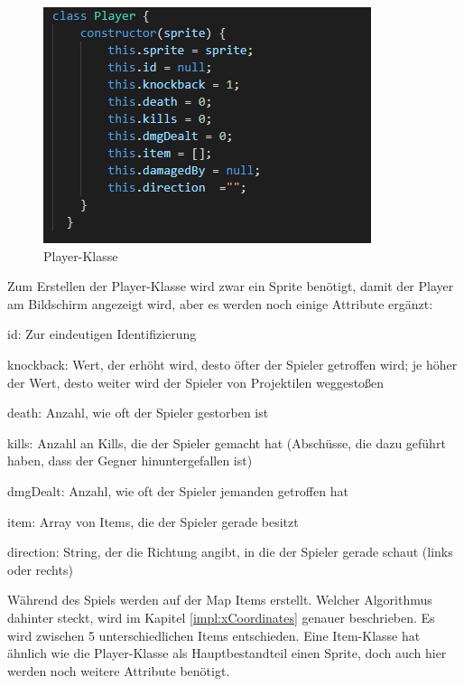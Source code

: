 \begin{figure}[H]
    \centering
    \includegraphics[scale=1]{pics/playerClass.PNG}
    \caption{Player-Klasse}
\end{figure}

Zum Erstellen der Player-Klasse wird zwar ein Sprite benötigt, damit der Player am Bildschirm angezeigt wird, aber es werden noch einige Attribute ergänzt:
\begin{compactitem}
    \item id: Zur eindeutigen Identifizierung
    \item knockback: Wert, der erhöht wird, desto öfter der Spieler getroffen wird; je höher der Wert, desto weiter wird der Spieler von Projektilen weggestoßen
    \item death: Anzahl, wie oft der Spieler gestorben ist
    \item kills: Anzahl an Kills, die der Spieler gemacht hat (Abschüsse, die dazu geführt haben, dass der Gegner hinuntergefallen ist)
    \item dmgDealt: Anzahl, wie oft der Spieler jemanden getroffen hat
    \item item: Array von Items, die der Spieler gerade besitzt
    \item direction: String, der die Richtung angibt, in die der Spieler gerade schaut (links oder rechts)
\end{compactitem}

Während des Spiels werden auf der Map Items erstellt. Welcher Algorithmus dahinter steckt, wird im Kapitel \ref{impl:xCoordinates} genauer beschrieben.
Es wird zwischen 5 unterschiedlichen Items entschieden. Eine Item-Klasse hat ähnlich wie die Player-Klasse als Hauptbestandteil einen Sprite, doch auch hier werden noch weitere Attribute benötigt.

